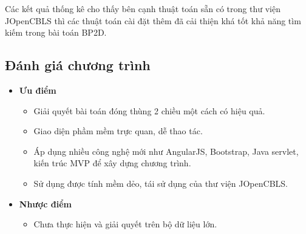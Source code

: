 Các kết quả thống kê cho thấy bên cạnh thuật toán sẵn có trong thư viện JOpenCBLS thì các thuật toán cài đặt thêm đã cải thiện khá tốt khả năng tìm kiếm trong bài toán BP2D.

\subsection{Đánh giá chương trình}
\begin{itemize}
	\item \textbf{Ưu điểm}\\
	\begin{itemize}
		\item Giải quyết bài toán đóng thùng 2 chiều một cách có hiệu quả.
		\item Giao diện phầm mềm trực quan, dễ thao tác.
		\item Áp dụng nhiều công nghệ mới như AngularJS, Bootstrap, Java servlet, kiến trúc MVP để xây dựng chương trình.
		\item Sử dụng được tính mềm dẻo, tái sử dụng của thư viện JOpenCBLS.
	\end{itemize}
	\item \textbf{Nhược điểm}
	\begin{itemize}
		\item Chưa thực hiện và giải quyết trên bộ dữ liệu lớn.
	\end{itemize}
\end{itemize}